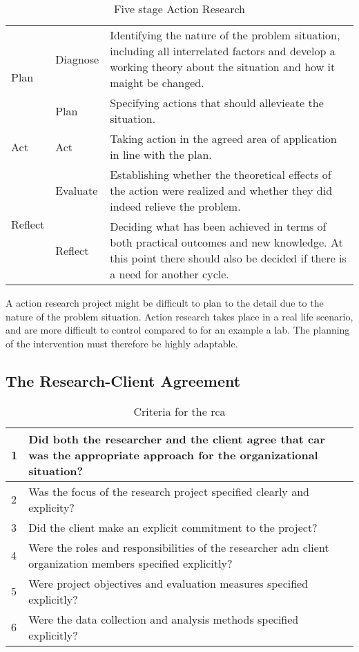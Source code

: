 \begin{table}
\begin{tabular}{m{2cm} m{2cm} m{8cm}}
\hline
\multirow{2}{*}{Plan} & Diagnose & Identifying the nature of the problem situation, including all interrelated factors and develop a working theory about the situation and how it maight be changed.\\
\cline{2-3}
 & Plan & Specifying actions that should allevieate the situation. \\
\hline
Act & Act & Taking action in the agreed area of application in line with the plan.\\
\hline
\multirow{2}{*}{Reflect} & Evaluate & Establishing whether the theoretical effects of the action were realized and whether they did indeed relieve the problem. \\
\cline{2-3}
 & Reflect &  Deciding what has been achieved in terms of both practical outcomes and new knowledge. At this point there should also be decided if there is a need for another cycle. \\
\hline
\end{tabular} 
\caption{Five stage Action Research\cite{bjo:risc}}
\end{table}
A action research project might be difficult to plan to the detail due to the nature of the problem situation. 
Action research takes place in a real life scenario, and are more difficult to control compared to for an example a lab.
The planning of the intervention must therefore be highly adaptable.




\subsection{The Research-Client Agreement}
\begin{table}
\centering
\begin{tabular}{p{2cm} p{6cm}}
\hline
\hline
1 & Did both the researcher and the client agree that \gls{car} was the appropriate approach for the organizational situation? \\\hline
2 & Was the focus of the research project specified clearly and explicity? \\\hline
3 & Did the client make an explicit commitment to the project? \\\hline
4 & Were the roles and responsibilities of the researcher adn client organization members specified explicitly? \\\hline
5 & Were project objectives and evaluation measures specified explicitly? \\\hline
6 & Were the data collection and analysis methods specified explicitly? \\\hline
\hline
\end{tabular}
\caption{Criteria for the \gls{rca}}
\label{tab:rcacriteria}
\end{table}

